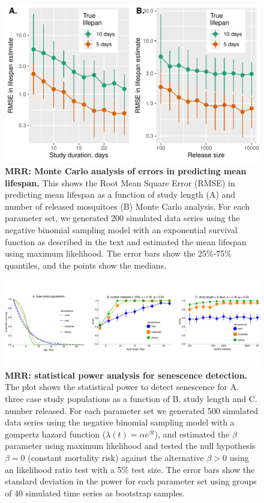 \documentclass[12pt]{article}
\begin{document}
\begin{figure}[ht]
	\centerline{\includegraphics[width=1.25\textwidth]{./Figure_files/mrr_power_analysis.pdf}}
	\caption{\textbf{MRR: Monte Carlo analysis of errors in predicting mean lifespan.} This shows the Root Mean Square Error (RMSE) in predicting mean lifespan as a function of study length (A) and number of released mosquitoes (B) Monte Carlo analysis. For each parameter set, we generated 200 simulated data series using the negative binomial sampling model with an exponential survival function as described in the text and estimated the mean lifespan using maximum likelihood. The error bars show the 25\%-75\% quantiles, and the points show the medians.}
	\label{fig:mrr_mcPowerAnalysis}
\end{figure}

\begin{figure}[ht]
	\centerline{\includegraphics[width=1.25\textwidth]{./Figure_files/power-analysis-senescence.pdf}}
	\caption{\textbf{MRR: statistical power analysis for senescence detection.} The plot shows the statistical power to detect senescence for A. three case study populations as a function of B. study length and C. number released. For each parameter set we generated 500 simulated data series using the negative binomial sampling model with a gompertz hazard function ($\lambda(t) = \alpha e^{\beta t}$), and estimated the $\beta$ parameter using maximum likelihood and tested the null hypothesis $\beta=0$ (constant mortality risk) against the alternative $\beta>0$ using an likelihood ratio test with a 5\% test size. The error bars show the standard deviation in the power for each parameter set using groups of 40 simulated time series as bootstrap samples.}
	\label{fig:mrr_mcPowerAnalysis_senescence}
\end{figure}




\end{document}
